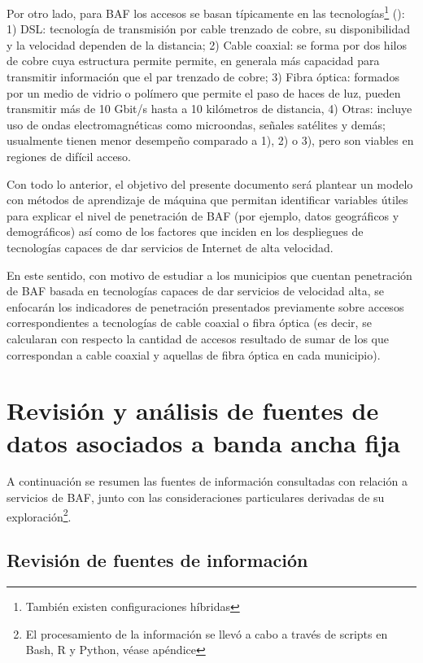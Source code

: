 \documentclass[9pt,twocolumn,twoside]{ilcss}
\begin{document}
Por otro lado, para BAF los accesos se basan típicamente en las tecnologías\footnote{También existen configuraciones híbridas} (\cite{moya2014telecomunicaciones}): 1) DSL: tecnología de transmisión por cable trenzado de cobre, su disponibilidad y la velocidad dependen de la distancia; 2) Cable coaxial: se forma por dos hilos de cobre cuya estructura permite permite, en generala más capacidad para transmitir información que el par trenzado de cobre; 3) Fibra óptica: formados por un medio de vidrio o polímero que permite el paso de haces de luz, pueden transmitir más de 10 Gbit/s hasta a 10 kilómetros de distancia, 4) Otras: incluye uso de ondas electromagnéticas como microondas, señales satélites y demás; usualmente  tienen menor desempeño comparado a 1), 2) o 3), pero son viables en regiones de difícil acceso.

Con todo lo anterior, el objetivo del presente documento será plantear un modelo con métodos de aprendizaje de máquina que permitan identificar variables útiles para explicar el nivel de penetración de BAF (por ejemplo, datos geográficos y demográficos) así como de los factores que inciden en los despliegues de tecnologías capaces de dar servicios de Internet de alta velocidad. 

En este sentido, con motivo de estudiar a los municipios que cuentan penetración de BAF basada en tecnologías capaces de dar servicios de velocidad alta, se enfocarán los indicadores de penetración presentados previamente sobre accesos correspondientes a tecnologías de cable coaxial o fibra óptica (es decir, se calcularan con respecto la cantidad de accesos resultado de sumar de los que correspondan a cable coaxial y aquellas de fibra óptica en cada municipio).

\section{Revisión y análisis de fuentes de datos asociados a banda ancha fija}

A continuación se resumen las fuentes de información consultadas con relación a servicios de BAF, junto con las consideraciones particulares derivadas de su exploración\footnote{El procesamiento de la información se llevó a cabo a través de scripts en Bash, R y Python, véase apéndice}. 

\subsection{Revisión de fuentes de información}
\end{document}
